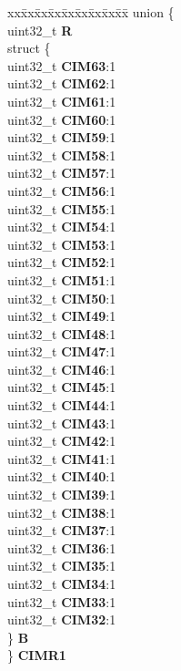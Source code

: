 \begin{DoxyCompactItemize}
\begin{tabbing}
\end{tabbing}\item 
\mbox{\label{structADC__tag_afe42551d28a76ba72482dea4eb9966c6}} 
\begin{tabbing}
xx\=xx\=xx\=xx\=xx\=xx\=xx\=xx\=xx\=\kill
union \{\\
\>uint32\_t {\bfseries R}\\
\>struct \{\\
\>\>uint32\_t {\bfseries CIM63}:1\\
\>\>uint32\_t {\bfseries CIM62}:1\\
\>\>uint32\_t {\bfseries CIM61}:1\\
\>\>uint32\_t {\bfseries CIM60}:1\\
\>\>uint32\_t {\bfseries CIM59}:1\\
\>\>uint32\_t {\bfseries CIM58}:1\\
\>\>uint32\_t {\bfseries CIM57}:1\\
\>\>uint32\_t {\bfseries CIM56}:1\\
\>\>uint32\_t {\bfseries CIM55}:1\\
\>\>uint32\_t {\bfseries CIM54}:1\\
\>\>uint32\_t {\bfseries CIM53}:1\\
\>\>uint32\_t {\bfseries CIM52}:1\\
\>\>uint32\_t {\bfseries CIM51}:1\\
\>\>uint32\_t {\bfseries CIM50}:1\\
\>\>uint32\_t {\bfseries CIM49}:1\\
\>\>uint32\_t {\bfseries CIM48}:1\\
\>\>uint32\_t {\bfseries CIM47}:1\\
\>\>uint32\_t {\bfseries CIM46}:1\\
\>\>uint32\_t {\bfseries CIM45}:1\\
\>\>uint32\_t {\bfseries CIM44}:1\\
\>\>uint32\_t {\bfseries CIM43}:1\\
\>\>uint32\_t {\bfseries CIM42}:1\\
\>\>uint32\_t {\bfseries CIM41}:1\\
\>\>uint32\_t {\bfseries CIM40}:1\\
\>\>uint32\_t {\bfseries CIM39}:1\\
\>\>uint32\_t {\bfseries CIM38}:1\\
\>\>uint32\_t {\bfseries CIM37}:1\\
\>\>uint32\_t {\bfseries CIM36}:1\\
\>\>uint32\_t {\bfseries CIM35}:1\\
\>\>uint32\_t {\bfseries CIM34}:1\\
\>\>uint32\_t {\bfseries CIM33}:1\\
\>\>uint32\_t {\bfseries CIM32}:1\\
\>\} {\bfseries B}\\
\} {\bfseries CIMR1}\\


\end{tabbing}
\end{DoxyCompactItemize}
